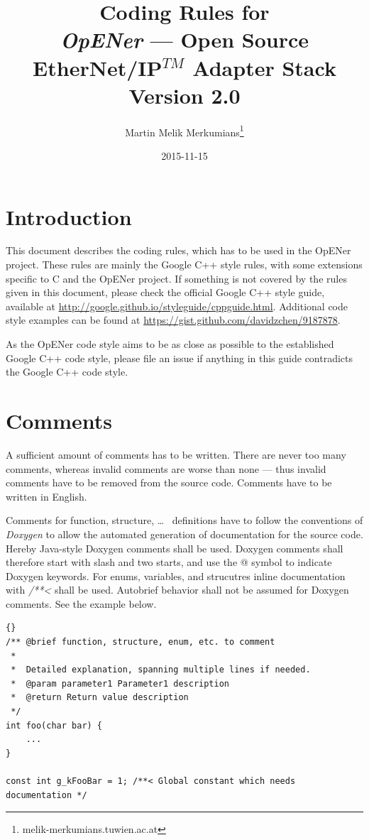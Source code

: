 \documentclass[final,a4paper,10pt, oneside]{article}
\title{Coding Rules for\\ \emph{OpENer} --- Open Source EtherNet/IP$^{TM}$ Adapter Stack\\\large Version 2.0}
\author{Martin Melik Merkumians\thanks{melik-merkumians\@@acin.tuwien.ac.at}}
\date{2015-11-15}
\begin{document}
\maketitle

\tableofcontents

\section{Introduction}
This document describes the coding rules, which has to be used in the OpENer project. These rules are mainly the Google C++ style rules, with some extensions specific to C and the OpENer project. If something is not covered by the rules given in this document, please check the official Google C++ style guide, available at \url{http://google.github.io/styleguide/cppguide.html}. Additional code style examples can be found at \url{https://gist.github.com/davidzchen/9187878}.

As the OpENer code style aims to be as close as possible to the established Google C++ code style, please file an issue if anything in this guide contradicts the Google C++ code style.

\section{Comments}
A sufficient amount of comments has to be written. There are never too many comments, whereas invalid comments are worse than none --- thus invalid comments have to be removed from the source code. Comments have to be written in English.


Comments for function, structure, \ldots~ definitions have to follow the conventions of \emph{Doxygen} to allow the automated generation of documentation for the source code. Hereby Java-style Doxygen comments shall be used. Doxygen comments shall therefore start with slash and two starts, and use the @ symbol to indicate Doxygen keywords. For enums, variables, and strucutres inline documentation with \emph{/**<} shall be used. Autobrief behavior shall not be assumed for Doxygen comments. See the example below.
\begin{lstlisting}[frame=trbl]{}
/** @brief function, structure, enum, etc. to comment
 *
 *  Detailed explanation, spanning multiple lines if needed.
 *  @param parameter1 Parameter1 description
 *  @return Return value description
 */
int foo(char bar) {
    ...
}

const int g_kFooBar = 1; /**< Global constant which needs documentation */

\end{lstlisting}
\end{document}

